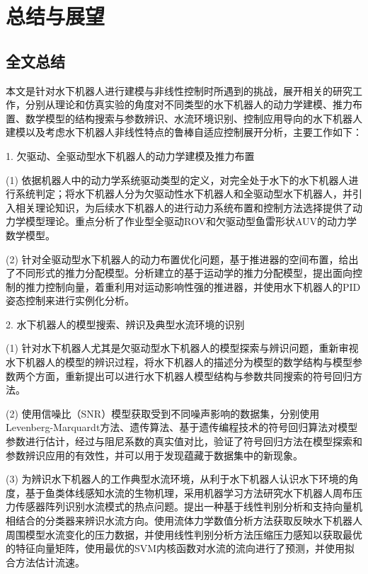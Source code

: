 
\chapter{总结与展望}

\label{chap:conclusion}
\section{全文总结}

本文是针对水下机器人进行建模与非线性控制时所遇到的挑战，展开相关的研究工作，分别从理论和仿真实验的角度对不同类型的水下机器人的动力学建模、推力布置、数学模型的结构搜索与参数辨识、水流环境识别、控制应用导向的水下机器人建模以及考虑水下机器人非线性特点的鲁棒自适应控制展开分析，主要工作如下：

1. 欠驱动、全驱动型水下机器人的动力学建模及推力布置

(1) 依据机器人中的动力学系统驱动类型的定义，对完全处于水下的水下机器人进行系统判定；将水下机器人分为欠驱动性水下机器人和全驱动型水下机器人，并引入相关理论知识，为后续水下机器人的进行动力系统布置和控制方法选择提供了动力学模型理论。重点分析了作业型全驱动ROV和欠驱动型鱼雷形状AUV的动力学数学模型。

(2) 针对全驱动型水下机器人的动力布置优化问题，基于推进器的空间布置，给出了不同形式的推力分配模型。分析建立的基于运动学的推力分配模型，提出面向控制的推力控制向量，着重利用对运动影响性强的推进器，并使用水下机器人的PID姿态控制来进行实例化分析。

2. 水下机器人的模型搜索、辨识及典型水流环境的识别

(1) 针对水下机器人尤其是欠驱动型水下机器人的模型探索与辨识问题，重新审视水下机器人的模型的辨识过程，将水下机器人的描述分为模型的数学结构与模型参数两个方面，重新提出可以进行水下机器人模型结构与参数共同搜索的符号回归方法。

(2) 使用信噪比（SNR）模型获取受到不同噪声影响的数据集，分别使用Levenberg-Marquardt方法、遗传算法、基于遗传编程技术的符号回归算法对模型参数进行估计，经过与阻尼系数的真实值对比，验证了符号回归方法在模型探索和参数辨识应用的有效性，并可以用于发现蕴藏于数据集中的新现象。

(3) 为辨识水下机器人的工作典型水流环境，从利于水下机器人认识水下环境的角度，基于鱼类体线感知水流的生物机理，采用机器学习方法研究水下机器人周布压力传感器阵列识别水流模式的热点问题。提出一种基于线性判别分析和支持向量机相结合的分类器来辨识水流方向。使用流体力学数值分析方法获取反映水下机器人周围模型水流变化的压力数据，并使用线性判别分析方法压缩压力感知以获取最优的特征向量矩阵，使用最优的SVM内核函数对水流的流向进行了预测，并使用拟合方法估计流速。

